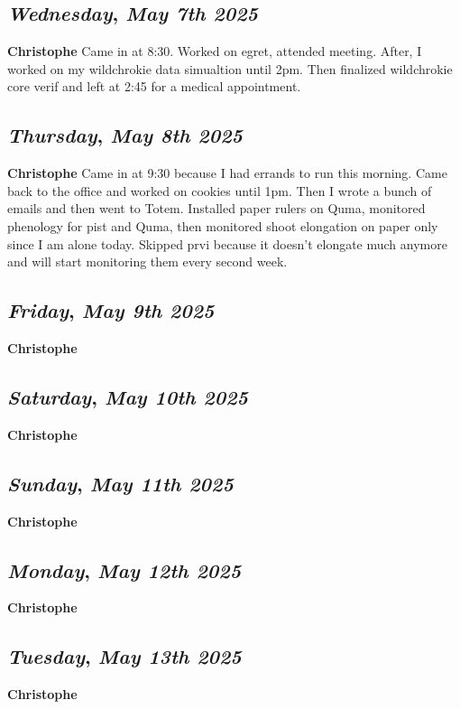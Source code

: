 \def\day{\textit{May 7th 2025}}
\def\weekday{\textit{Wednesday}}
\subsection*{\weekday, \day}
\textbf {Christophe}
Came in at 8:30. Worked on egret, attended meeting. After, I worked on my wildchrokie data simualtion until 2pm. Then finalized wildchrokie core verif and left at 2:45 for a medical appointment. 

\def\day{\textit{May 8th 2025}}
\def\weekday{\textit{Thursday}}
\subsection*{\weekday, \day}
\textbf {Christophe}
Came in at 9:30 because I had errands to run this morning. Came back to the office and worked on cookies until 1pm. Then I wrote a bunch of emails and then went to Totem. Installed paper rulers on Quma, monitored phenology for pist and Quma, then monitored shoot elongation on paper only since I am alone today. Skipped prvi because it doesn't elongate much anymore and will start monitoring them every second week. 

\def\day{\textit{May 9th 2025}}
\def\weekday{\textit{Friday}}
\subsection*{\weekday, \day}
\textbf {Christophe}

\def\day{\textit{May 10th 2025}}
\def\weekday{\textit{Saturday}}
\subsection*{\weekday, \day}
\textbf {Christophe}

\def\day{\textit{May 11th 2025}}
\def\weekday{\textit{Sunday}}
\subsection*{\weekday, \day}
\textbf {Christophe}

\def\day{\textit{May 12th 2025}}
\def\weekday{\textit{Monday}}
\subsection*{\weekday, \day}
\textbf {Christophe}

\def\day{\textit{May 13th 2025}}
\def\weekday{\textit{Tuesday}}
\subsection*{\weekday, \day}
\textbf {Christophe}

